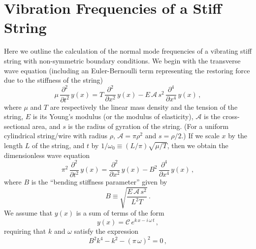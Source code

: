 %
%
%

 \section{Vibration Frequencies of a Stiff String\label{app:freq}}

Here we outline the calculation of the normal mode frequencies of a vibrating stiff string with non-symmetric boundary conditions. We begin with the transverse wave equation (including an Euler-Bernoulli term representing the restoring force due to the stiffness of the string)~\cite{ref:fletcher1964nvf}
 \begin{equation}
\mu\, \frac{\partial^2}{\partial t^2}\, y(x) = T\, \frac{\partial^2}{\partial x^2}\, y(x) - E\, \mathcal{A}\, s^2\, \frac{\partial^4}{\partial x^4}\, y (x)\, ,
 \end{equation}
where $\mu$ and $T$ are respectively the linear mass density and the tension of the string, $E$ is its Young's modulus (or the modulus of elasticity), $\mathcal{A}$ is the cross-sectional area, and $s$ is the radius of gyration of the string. (For a uniform cylindrical string/wire with radius $\rho$, $\mathcal{A} = \pi \rho^2$ and $s = \rho/2$.) If we scale $x$ by the length $L$ of the string, and $t$ by $1/\omega_0 \equiv  (L/\pi) \sqrt{\mu/T}$, then we obtain the dimensionless wave equation
 \begin{equation} \label{eqn:wave_eqn_dim}
\pi^2\, \frac{\partial^2}{\partial t^2}\, y(x) = \frac{\partial^2}{\partial x^2}\, y(x) - B^2\, \frac{\partial^4}{\partial x^4}\, y (x)\, ,
 \end{equation}
where $B$ is the ``bending stiffness parameter'' given by
 \begin{equation}
B \equiv \sqrt{\frac{E\, \mathcal{A}\, s^2}{L^2 T}}\, .
 \end{equation}
We assume that $y(x)$ is a sum of terms of the form
 \begin{equation}
y(x) = \mathcal{C}\, e^{k\, x - i\, \omega\, t}\, ,
 \end{equation}
requiring that $k$ and $\omega$ satisfy the expression
 \begin{equation} \label{eqn:kw}
B^2 k^4 - k^2 - (\pi\, \omega)^2 = 0\, ,
 \end{equation}
